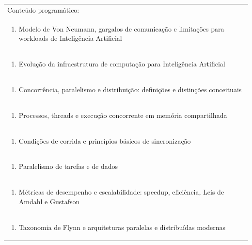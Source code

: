 \documentclass[11pt]{article}
\begin{document}
\begin{center}
\begin{longtable}{|p{4cm}|p{4cm}|p{4cm}|p{4cm}|}
\hline
\multicolumn{4}{|p{16cm}|}{Conteúdo programático:}\\*
\multicolumn{4}{|p{\dimexpr 16cm + 6\tabcolsep\relax}|}{\begin{enumerate}[start=1]\item Modelo de Von Neumann, gargalos de comunicação e limitações para workloads de Inteligência Artificial\end{enumerate}}\\
\multicolumn{4}{|p{\dimexpr 16cm + 6\tabcolsep\relax}|}{\begin{enumerate}[start=2]\item Evolução da infraestrutura de computação para Inteligência Artificial\end{enumerate}}\\
\multicolumn{4}{|p{\dimexpr 16cm + 6\tabcolsep\relax}|}{\begin{enumerate}[start=3]\item Concorrência, paralelismo e distribuição: definições e distinções conceituais\end{enumerate}}\\
\multicolumn{4}{|p{\dimexpr 16cm + 6\tabcolsep\relax}|}{\begin{enumerate}[start=4]\item Processos, threads e execução concorrente em memória compartilhada\end{enumerate}}\\
\multicolumn{4}{|p{\dimexpr 16cm + 6\tabcolsep\relax}|}{\begin{enumerate}[start=5]\item Condições de corrida e princípios básicos de sincronização\end{enumerate}}\\
\multicolumn{4}{|p{\dimexpr 16cm + 6\tabcolsep\relax}|}{\begin{enumerate}[start=6]\item Paralelismo de tarefas e de dados\end{enumerate}}\\
\multicolumn{4}{|p{\dimexpr 16cm + 6\tabcolsep\relax}|}{\begin{enumerate}[start=7]\item Métricas de desempenho e escalabilidade: speedup, eficiência, Leis de Amdahl e Gustafson\end{enumerate}}\\
\multicolumn{4}{|p{\dimexpr 16cm + 6\tabcolsep\relax}|}{\begin{enumerate}[start=8]\item Taxonomia de Flynn e arquiteturas paralelas e distribuídas modernas\end{enumerate}}\\

\end{longtable}
\end{center}
\end{document}

